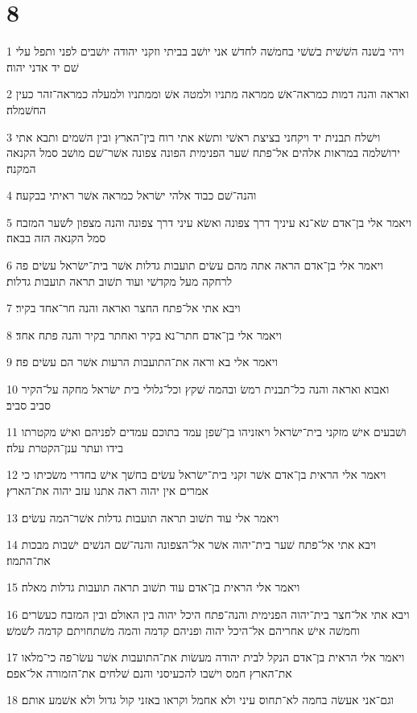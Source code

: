 \chapter{8}

\par 1 ויהי בשׁנה השׁשׁית בשׁשׁי בחמשׁה לחדשׁ אני יושׁב בביתי וזקני יהודה יושׁבים לפני ותפל עלי שׁם יד אדני יהוה׃
\par 2 ואראה והנה דמות כמראה־אשׁ ממראה מתניו ולמטה אשׁ וממתניו ולמעלה כמראה־זהר כעין החשׁמלה׃
\par 3 וישׁלח תבנית יד ויקחני בציצת ראשׁי ותשׂא אתי רוח בין־הארץ ובין השׁמים ותבא אתי ירושׁלמה במראות אלהים אל־פתח שׁער הפנימית הפונה צפונה אשׁר־שׁם מושׁב סמל הקנאה המקנה׃
\par 4 והנה־שׁם כבוד אלהי ישׂראל כמראה אשׁר ראיתי בבקעה׃
\par 5 ויאמר אלי בן־אדם שׂא־נא עיניך דרך צפונה ואשׂא עיני דרך צפונה והנה מצפון לשׁער המזבח סמל הקנאה הזה בבאה׃
\par 6 ויאמר אלי בן־אדם הראה אתה מהם עשׂים תועבות גדלות אשׁר בית־ישׂראל עשׂים פה לרחקה מעל מקדשׁי ועוד תשׁוב תראה תועבות גדלות׃
\par 7 ויבא אתי אל־פתח החצר ואראה והנה חר־אחד בקיר׃
\par 8 ויאמר אלי בן־אדם חתר־נא בקיר ואחתר בקיר והנה פתח אחד׃
\par 9 ויאמר אלי בא וראה את־התועבות הרעות אשׁר הם עשׂים פה׃
\par 10 ואבוא ואראה והנה כל־תבנית רמשׂ ובהמה שׁקץ וכל־גלולי בית ישׂראל מחקה על־הקיר סביב סביב׃
\par 11 ושׁבעים אישׁ מזקני בית־ישׂראל ויאזניהו בן־שׁפן עמד בתוכם עמדים לפניהם ואישׁ מקטרתו בידו ועתר ענן־הקטרת עלה׃
\par 12 ויאמר אלי הראית בן־אדם אשׁר זקני בית־ישׂראל עשׂים בחשׁך אישׁ בחדרי משׂכיתו כי אמרים אין יהוה ראה אתנו עזב יהוה את־הארץ׃
\par 13 ויאמר אלי עוד תשׁוב תראה תועבות גדלות אשׁר־המה עשׂים׃
\par 14 ויבא אתי אל־פתח שׁער בית־יהוה אשׁר אל־הצפונה והנה־שׁם הנשׁים ישׁבות מבכות את־התמוז׃
\par 15 ויאמר אלי הראית בן־אדם עוד תשׁוב תראה תועבות גדלות מאלה׃
\par 16 ויבא אתי אל־חצר בית־יהוה הפנימית והנה־פתח היכל יהוה בין האולם ובין המזבח כעשׂרים וחמשׁה אישׁ אחריהם אל־היכל יהוה ופניהם קדמה והמה משׁתחויתם קדמה לשׁמשׁ׃
\par 17 ויאמר אלי הראית בן־אדם הנקל לבית יהודה מעשׂות את־התועבות אשׁר עשׂו־פה כי־מלאו את־הארץ חמס וישׁבו להכעיסני והנם שׁלחים את־הזמורה אל־אפם׃
\par 18 וגם־אני אעשׂה בחמה לא־תחוס עיני ולא אחמל וקראו באזני קול גדול ולא אשׁמע אותם׃

